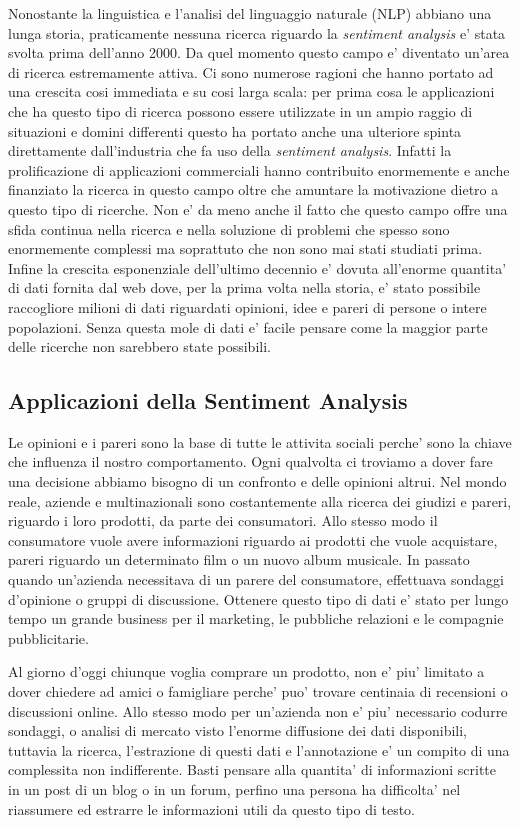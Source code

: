 \documentclass[a4paper,11pt]{book}
\theoremstyle{definition}
\begin{document}
Nonostante la linguistica e l'analisi del linguaggio naturale (NLP) abbiano una lunga
storia, praticamente nessuna ricerca riguardo la \emph{sentiment analysis} e' stata
svolta prima dell'anno 2000. Da quel momento questo campo e' diventato un'area
di ricerca estremamente attiva. Ci sono numerose ragioni che hanno
portato ad una crescita cosi immediata e su cosi larga scala: per prima cosa le applicazioni
che ha questo tipo di ricerca possono essere utilizzate in un ampio raggio di 
situazioni e domini differenti questo ha portato anche una ulteriore spinta 
direttamente dall'industria che fa uso della \emph{sentiment analysis}.
Infatti la prolificazione di applicazioni
commerciali hanno contribuito enormemente e anche finanziato la ricerca in questo campo oltre
che amuntare la motivazione dietro a questo tipo di ricerche. Non e' da meno anche il
fatto che questo campo offre una sfida continua nella ricerca e nella soluzione di problemi
che spesso sono enormemente complessi ma soprattuto che non sono mai stati studiati prima.
Infine la crescita esponenziale dell'ultimo decennio e' dovuta all'enorme 
quantita' di dati fornita dal web dove, per la prima volta nella storia, e' stato possibile
raccogliore milioni di dati riguardati opinioni, idee e pareri di persone o intere 
popolazioni.
Senza questa mole di dati e' facile pensare come la maggior parte delle ricerche non
sarebbero state possibili.

\subsection{Applicazioni della Sentiment Analysis}
Le opinioni e i pareri sono la base di tutte le attivita sociali perche' sono la chiave
che influenza il nostro comportamento.
Ogni qualvolta ci troviamo a dover fare una decisione abbiamo bisogno di un confronto e delle
opinioni altrui. Nel mondo reale, aziende e multinazionali sono costantemente alla 
ricerca dei giudizi e pareri, riguardo i loro prodotti, da parte dei consumatori.
Allo stesso modo il consumatore vuole avere informazioni riguardo ai prodotti che vuole
acquistare, pareri riguardo un determinato film o un nuovo album musicale.
In passato quando un'azienda necessitava di un parere del consumatore, effettuava sondaggi
d'opinione o gruppi di discussione. Ottenere questo tipo di dati e' stato per lungo
tempo un grande business per il marketing, le pubbliche relazioni e le compagnie pubblicitarie.

Al giorno d'oggi chiunque voglia comprare un prodotto, non e' piu' limitato a dover chiedere
ad amici o famigliare perche' puo' trovare centinaia di recensioni o discussioni online.
Allo stesso modo per un'azienda non e' piu' necessario codurre sondaggi, o analisi di mercato
visto l'enorme diffusione dei dati disponibili, tuttavia la ricerca, l'estrazione di questi dati e l'annotazione e' un compito di una complessita non indifferente.
Basti pensare alla quantita' di informazioni scritte in un post di un blog o in un forum,
perfino una persona ha difficolta' nel riassumere ed estrarre le informazioni utili da questo
tipo di testo.
\end{document}
